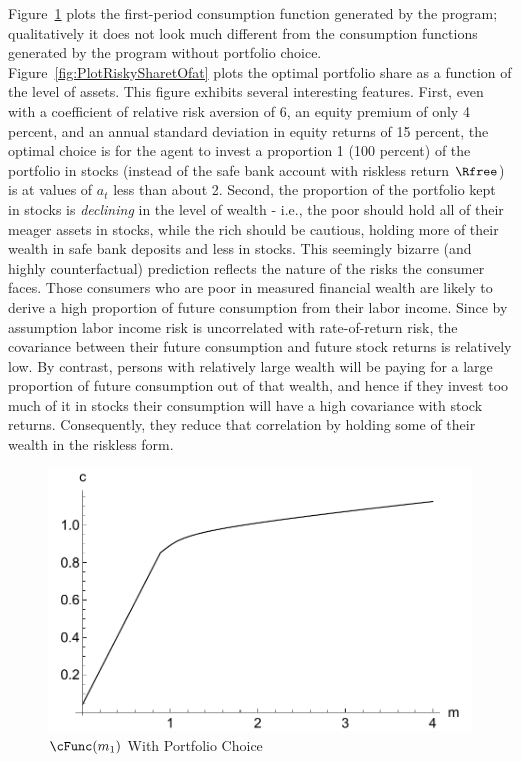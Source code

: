 \documentclass[titlepage]{\econtex}
\begin{document}
Figure~\ref{fig:PlotctMultContr} plots the first-period consumption
function generated by the program; qualitatively it does not look much
different from the consumption functions generated by the program
without portfolio choice.  Figure~\ref{fig:PlotRiskySharetOfat} plots the
optimal portfolio share as a function of the level of assets.  This
figure exhibits several interesting features.  First, even with a
coefficient of relative risk aversion of 6, an equity premium of only
4 percent, and an annual standard deviation in equity returns of 15
percent, the optimal choice is for the agent
to invest a proportion 1 (100 percent) of the portfolio in stocks (instead of the safe bank account with riskless return $\Rfree$) is
at values of ${a}_{t}$ less than about 2.  Second, the
proportion of the portfolio kept in stocks is \textit{declining} in the
level of wealth - i.e., the poor should hold all of their meager
assets in stocks, while the rich should be cautious, holding more of
their wealth in safe bank deposits and less in stocks.  This
seemingly bizarre (and highly counterfactual) prediction reflects the
nature of the risks the consumer faces.  Those consumers who are poor
in measured financial wealth are likely to derive a high proportion of
future consumption from their labor income.  Since by assumption labor
income risk is uncorrelated with rate-of-return risk, the covariance
between their future consumption and future stock returns is
relatively low.  By contrast, persons with relatively large wealth
will be paying for a large proportion of future consumption out of that
wealth, and hence if they invest too much of it in stocks their consumption
will have a high covariance with stock returns.  Consequently, they
reduce that correlation by holding some of their wealth in the
riskless form.

\hypertarget{PlotctMultContr}{}
\begin{figure}
  \includegraphics{./Figures/PlotctMultContr}
  \caption{$\cFunc({m}_{1})$ With Portfolio Choice}
  \label{fig:PlotctMultContr}
\end{figure}
\end{document}
